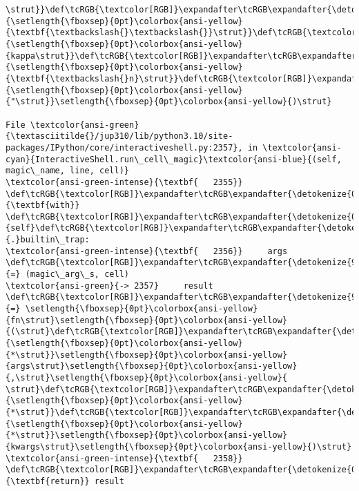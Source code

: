 \documentclass[landscape,letterpaper,10pt,english]{article}
\begin{document}
\begin{Verbatim}[commandchars=\\\{\}, frame=single, framerule=2mm, rulecolor=\color{outerrorbackground}]
\strut}}\def\tcRGB{\textcolor[RGB]}\expandafter\tcRGB\expandafter{\detokenize{175,95,0}}{\setlength{\fboxsep}{0pt}\colorbox{ansi-yellow}{\textbf{\textbackslash{}\textbackslash{}}\strut}}\def\tcRGB{\textcolor[RGB]}\expandafter\tcRGB\expandafter{\detokenize{175,0,0}}{\setlength{\fboxsep}{0pt}\colorbox{ansi-yellow}{kappa\strut}}\def\tcRGB{\textcolor[RGB]}\expandafter\tcRGB\expandafter{\detokenize{175,95,0}}{\setlength{\fboxsep}{0pt}\colorbox{ansi-yellow}{\textbf{\textbackslash{}n}\strut}}\def\tcRGB{\textcolor[RGB]}\expandafter\tcRGB\expandafter{\detokenize{175,0,0}}{\setlength{\fboxsep}{0pt}\colorbox{ansi-yellow}{"\strut}}\setlength{\fboxsep}{0pt}\colorbox{ansi-yellow}{)\strut}

File \textcolor{ansi-green}{\textasciitilde{}/jup310/lib/python3.10/site-packages/IPython/core/interactiveshell.py:2357}, in \textcolor{ansi-cyan}{InteractiveShell.run\_cell\_magic}\textcolor{ansi-blue}{(self, magic\_name, line, cell)}
\textcolor{ansi-green-intense}{\textbf{   2355}} \def\tcRGB{\textcolor[RGB]}\expandafter\tcRGB\expandafter{\detokenize{0,135,0}}{\textbf{with}} \def\tcRGB{\textcolor[RGB]}\expandafter\tcRGB\expandafter{\detokenize{0,135,0}}{self}\def\tcRGB{\textcolor[RGB]}\expandafter\tcRGB\expandafter{\detokenize{98,98,98}}{.}builtin\_trap:
\textcolor{ansi-green-intense}{\textbf{   2356}}     args \def\tcRGB{\textcolor[RGB]}\expandafter\tcRGB\expandafter{\detokenize{98,98,98}}{=} (magic\_arg\_s, cell)
\textcolor{ansi-green}{-> 2357}     result \def\tcRGB{\textcolor[RGB]}\expandafter\tcRGB\expandafter{\detokenize{98,98,98}}{=} \setlength{\fboxsep}{0pt}\colorbox{ansi-yellow}{fn\strut}\setlength{\fboxsep}{0pt}\colorbox{ansi-yellow}{(\strut}\def\tcRGB{\textcolor[RGB]}\expandafter\tcRGB\expandafter{\detokenize{98,98,98}}{\setlength{\fboxsep}{0pt}\colorbox{ansi-yellow}{*\strut}}\setlength{\fboxsep}{0pt}\colorbox{ansi-yellow}{args\strut}\setlength{\fboxsep}{0pt}\colorbox{ansi-yellow}{,\strut}\setlength{\fboxsep}{0pt}\colorbox{ansi-yellow}{ \strut}\def\tcRGB{\textcolor[RGB]}\expandafter\tcRGB\expandafter{\detokenize{98,98,98}}{\setlength{\fboxsep}{0pt}\colorbox{ansi-yellow}{*\strut}}\def\tcRGB{\textcolor[RGB]}\expandafter\tcRGB\expandafter{\detokenize{98,98,98}}{\setlength{\fboxsep}{0pt}\colorbox{ansi-yellow}{*\strut}}\setlength{\fboxsep}{0pt}\colorbox{ansi-yellow}{kwargs\strut}\setlength{\fboxsep}{0pt}\colorbox{ansi-yellow}{)\strut}
\textcolor{ansi-green-intense}{\textbf{   2358}} \def\tcRGB{\textcolor[RGB]}\expandafter\tcRGB\expandafter{\detokenize{0,135,0}}{\textbf{return}} result


\end{Verbatim}
\end{document}
